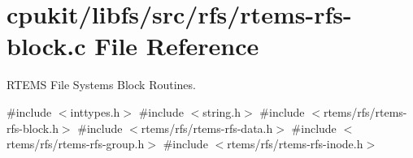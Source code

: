 \hypertarget{rtems-rfs-block_8c}{}\section{cpukit/libfs/src/rfs/rtems-\/rfs-\/block.c File Reference}
\label{rtems-rfs-block_8c}


R\+T\+E\+MS File Systems Block Routines.  


{\ttfamily \#include $<$inttypes.\+h$>$}\newline
{\ttfamily \#include $<$string.\+h$>$}\newline
{\ttfamily \#include $<$rtems/rfs/rtems-\/rfs-\/block.\+h$>$}\newline
{\ttfamily \#include $<$rtems/rfs/rtems-\/rfs-\/data.\+h$>$}\newline
{\ttfamily \#include $<$rtems/rfs/rtems-\/rfs-\/group.\+h$>$}\newline
{\ttfamily \#include $<$rtems/rfs/rtems-\/rfs-\/inode.\+h$>$}\newline

